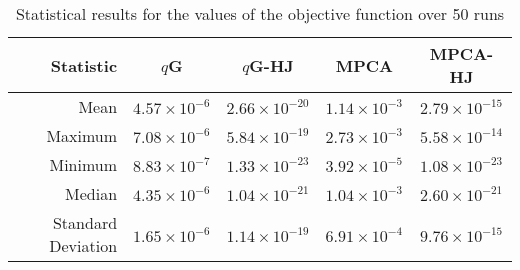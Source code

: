 \begin{table}[!ht]
\footnotesize
\centering
\caption{Statistical results for the values of the objective function over 50 runs}
\label{tab:conv}
\begin{tabular}{rcccc}
\hline
Statistic & $q$G & $q$G-HJ & MPCA & MPCA-HJ\\
\hline
Mean& $ 4.57\times 10^{-6} $& $ 2.66\times 10^{-20} $& $ 1.14\times 10^{-3} $& $ 2.79\times 10^{-15} $\\
Maximum& $ 7.08\times 10^{-6} $& $ 5.84\times 10^{-19} $& $ 2.73\times 10^{-3} $& $ 5.58\times 10^{-14} $\\
Minimum& $ 8.83\times 10^{-7} $& $ 1.33\times 10^{-23} $& $ 3.92\times 10^{-5} $& $ 1.08\times 10^{-23} $\\
Median& $ 4.35\times 10^{-6}$& $ 1.04\times 10^{-21}$& $ 1.04\times 10^{-3}$& $ 2.60\times 10^{-21}$\\
Standard Deviation& $ 1.65\times 10^{-6} $& $ 1.14\times 10^{-19} $& $ 6.91\times 10^{-4} $& $ 9.76\times 10^{-15} $\\
\hline
\end{tabular}

\end{table}